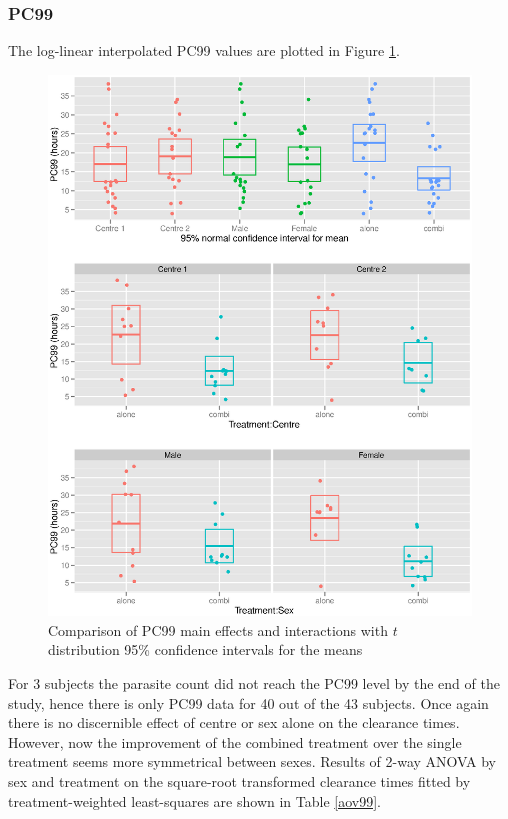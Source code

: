 \subsubsection*{PC99}
The log-linear interpolated PC99 values are plotted in Figure \ref{pc99anova}.
\begin{figure}[p]
\includegraphics[width=150mm]{pc99anova.eps} 
\caption{Comparison of PC99 main effects and interactions with $t$ distribution 95\% confidence intervals for the means}
\label{pc99anova}
\end{figure}
For 3 subjects the parasite count did not reach the PC99 level by the end of the study, hence there is only PC99 data for 40 out of the 43 subjects. Once again there is no discernible effect of centre or sex alone on the clearance times. However, now the improvement of the combined treatment over the single treatment seems more symmetrical between sexes. Results of 2-way ANOVA by sex and treatment on the square-root transformed clearance times fitted by treatment-weighted least-squares are shown in Table \ref{aov99}.
